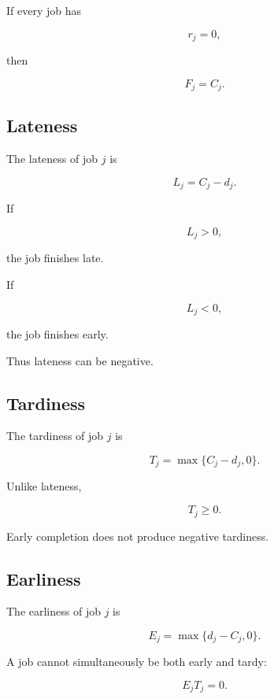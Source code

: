 If every job has

\[
r_j=0,
\]

then

\[
\boxed{
F_j=C_j.
}
\]

\subsection{Lateness}
\label{subsec:scheduling-lateness}

The lateness of job \(j\) is

\[
\boxed{
L_j
=
C_j-d_j.
}
\]

If

\[
L_j>0,
\]

the job finishes late.

If

\[
L_j<0,
\]

the job finishes early.

Thus lateness can be negative.

\subsection{Tardiness}
\label{subsec:scheduling-tardiness}

The tardiness of job \(j\) is

\[
\boxed{
T_j
=
\max
\{
C_j-d_j,
0
\}.
}
\]

Unlike lateness,

\[
\boxed{
T_j\geq0.
}
\]

Early completion does not produce negative tardiness.

\subsection{Earliness}
\label{subsec:scheduling-earliness}

The earliness of job \(j\) is

\[
\boxed{
E_j
=
\max
\{
d_j-C_j,
0
\}.
}
\]

A job cannot simultaneously be both early and tardy:

\[
\boxed{
E_jT_j=0.
}
\]

